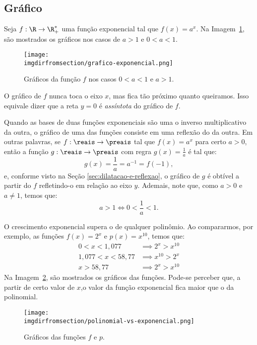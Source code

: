 \subsection{Gráfico}

\begin{example}
    Seja $f: \R \to \R_+^*$ uma função exponencial tal que $f(x) = a^x$. Na Imagem~\ref{img:graficos-exponencial}, são mostrados os gráficos nos casos de $a > 1$ e $0 < a < 1$.
    \begin{figure}[H]
        \centering
        \texttt{[image: \\imgdirfromsection/grafico-exponencial.png]}
        \caption{Gráficos da função $f$ nos casos $0<a<1$ e $a>1$.}
        \label{img:graficos-exponencial}
    \end{figure}
    O gráfico de $f$ nunca toca o eixo $x$, mas fica tão próximo quanto queiramos. Isso equivale dizer que a reta $y=0$ é \emph{assíntota} do gráfico de $f$.
\end{example}

\begin{remark}
    Quando as bases de duas funções exponenciais são uma o inverso multiplicativo da outra, o gráfico de uma das funções consiste em uma reflexão do da outra. Em outras palavras, se $f:\reais \to \preais$ tal que $f(x) = a^x $ para certo $a > 0$, então a função $g:\reais \to \preais$ com regra $g(x) = \frac 1 a$ é tal que:
    \[
        g(x) = \frac 1 a = a^{-1} = f(-1),    
    \]
    e, conforme visto na Seção \ref{sec:dilatacao-e-reflexao}, o gráfico de $g$ é obtível a partir do $f$ refletindo-o em relação ao eixo $y$. Ademais, note que, como $a > 0$ e $a \ne 1$, temos que:
    \[
        a > 1 \iff 0 < \frac{1}{a} < 1.
    \]
\end{remark}

\begin{example}
    O crescimento exponencial supera o de qualquer polinômio. Ao compararmos, por exemplo, as funções $f(x) = 2^x$ e $p(x)=x^{10}$, temos que:
    \begin{align*}
        0<x<1{,}077 & \implies  2^x > x^{10} \\
        1{,}077 < x < 58{,}77 & \implies  x^{10} > 2^x \\
        x>58{,}77 & \implies  2^x > x^{10}
    \end{align*}
    Na Imagem~\ref{img:polinomial-vs-exponencial}, são mostrados os gráficos das funções. Pode-se perceber que, a partir de certo valor de $x$,o valor da função exponencial fica maior que o da polinomial. 
    \begin{figure}[H]
        \centering
        \texttt{[image: \\imgdirfromsection/polinomial-vs-exponencial.png]}
        \caption{Gráficos das funções $f$ e $p$.}
        \label{img:polinomial-vs-exponencial}
    \end{figure}
\end{example}

